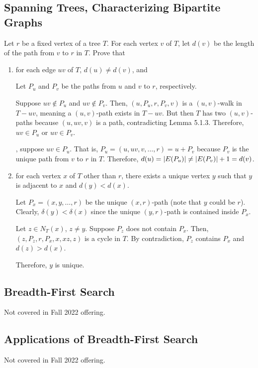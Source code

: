 \subsection{Spanning Trees, Characterizing Bipartite Graphs}

\begin{xca}
  Let $r$ be a fixed vertex of a tree $T$.
  For each vertex $v$ of $T$, let $d(v)$ be
  the length of the path from $v$ to $r$ in $T$. Prove that
\end{xca}
\begin{enumerate}
  \item for each edge $uv$ of $T$, $d(u) \neq d(v)$, and
        \begin{prf}
          Let $P_u$ and $P_v$ be the paths from $u$ and $v$ to $r$, respectively.

          Suppose $uv \not\in P_u$ and $uv \not\in P_v$.
          Then, $(u,P_u,r,P_v,v)$ is a $(u,v)$-walk in $T-uv$,
          meaning a $(u,v)$-path exists in $T-uv$.
          But then $T$ has two $(u,v)$-paths because $(u,uv,v)$ is a path,
          contradicting Lemma 5.1.3.
          Therefore, $uv \in P_u$ or $uv \in P_v$.

          \WLOG, suppose $uv \in P_u$.
          That is, $P_u = (u,uv,v,\dotsc,r) = u + P_v$
          because $P_v$ is the unique path from $v$ to $r$ in $T$.
          Therefore, $d(u) = \abs{E(P_u)} \neq \abs{E(P_v)} + 1 = d(v)$.
        \end{prf}
  \item for each vertex $x$ of $T$ other than $r$,
        there exists a unique vertex $y$
        such that $y$ is adjacent to $x$ and $d(y) < d(x)$.
        \begin{prf}
          Let $P_x = (x,y,\dotsc,r)$ be the unique $(x,r)$-path (note that $y$ could be $r$).
          Clearly, $\delta(y) < \delta(x)$ since the unique $(y,r)$-path
          is contained inside $P_x$.

          Let $z \in N_T(x)$, $z \neq y$.
          Suppose $P_z$ does not contain $P_x$.
          Then, $(z,P_z,r,P_x,x,xz,z)$ is a cycle in $T$.
          By contradiction, $P_z$ contains $P_x$ and $d(z) > d(x)$.

          Therefore, $y$ is unique.
        \end{prf}
\end{enumerate}

\subsection{Breadth-First Search}

Not covered in Fall 2022 offering.

\subsection{Applications of Breadth-First Search}

Not covered in Fall 2022 offering.
